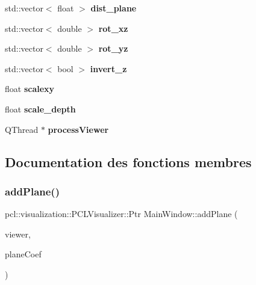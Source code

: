 \begin{DoxyCompactItemize}
\item 
\mbox{\label{classMainWindow_ad4f4b6bc69443cc48c82cd84330c64e0}} 
std\+::vector$<$ float $>$ {\bfseries dist\+\_\+plane}
\item 
\mbox{\label{classMainWindow_a42337f458dbab83dae12673acafa5916}} 
std\+::vector$<$ double $>$ {\bfseries rot\+\_\+xz}
\item 
\mbox{\label{classMainWindow_a2fbedc27fd4c6a38bf43475547b40159}} 
std\+::vector$<$ double $>$ {\bfseries rot\+\_\+yz}
\item 
\mbox{\label{classMainWindow_acbfecd04d6d7a18181b01fdefd46ad5f}} 
std\+::vector$<$ bool $>$ {\bfseries invert\+\_\+z}
\item 
\mbox{\label{classMainWindow_a7a6950a1f310fb06a75e2fa657c40ec0}} 
float {\bfseries scalexy}
\item 
\mbox{\label{classMainWindow_a610e1dd9a8cb241e02c14109d0647c28}} 
float {\bfseries scale\+\_\+depth}
\item 
\mbox{\label{classMainWindow_aff5e355080dbdafbf461ba40bd877db5}} 
Q\+Thread $\ast$ {\bfseries process\+Viewer}
\end{DoxyCompactItemize}


\subsection{Documentation des fonctions membres}
\mbox{\label{classMainWindow_abe57e522ecabb790bbb41ce813ea2a70}} 
\subsubsection{\texorpdfstring{add\+Plane()}{addPlane()}}
{\footnotesize\ttfamily pcl\+::visualization\+::\+P\+C\+L\+Visualizer\+::\+Ptr Main\+Window\+::add\+Plane (\begin{DoxyParamCaption}\item[{pcl\+::visualization\+::\+P\+C\+L\+Visualizer\+::\+Ptr}]{viewer,  }\item[{pcl\+::\+Model\+Coefficients}]{plane\+Coef }\end{DoxyParamCaption})}



